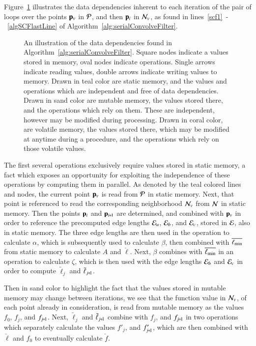 Figure~\ref{fig:sacfDataDependencies} illustrates the data dependencies inherent to each iteration of the pair of loops over the points $\mathbf{p}_v$ in $\mathcal{P}$, and then $\mathbf{p}_i$ in $\mathcal{N}_v$, as found in lines~\ref{scf1}~-~\ref{algSCFlastLine} of Algorithm~\ref{alg:serialConvolveFilter}.

\begin{figure}[ht]
	
	{\caption[Data Dependencies in Serial Algorithm~\ref{alg:serialConvolveFilter}: Calculate Edge Lengths]{An illustration of the data dependencies found in Algorithm~\ref{alg:serialConvolveFilter}. Square nodes indicate a values stored in memory, oval nodes indicate operations. Single arrows indicate reading values, double arrows indicate writing values to memory. Drawn in teal color are static memory, and the values and operations which are independent and free of data dependencies. Drawn in sand color are mutable memory, the values stored there, and the operations which rely on them. These are independent, however may be modified during processing. Drawn in coral color, are volatile memory, the values stored there, which may be modified at anytime during a procedure, and the operations which rely on those volatile values.}\label{fig:sacfDataDependencies}}
\end{figure}

The first several operations exclusively require values stored in static memory, a fact which exposes an opportunity for exploiting the independence of these operations by computing them in parallel. As denoted by the teal colored lines and nodes, the current point $\mathbf{p}_v$ is read from $\mathcal{P}$ in static memory. Next, that point is referenced to read the corresponding neighborhood $\mathcal{N}_v$ from $\mathcal{N}$ in static memory. Then the points $\mathbf{p}_i$ and $\bp_{\sipo}$ are determined, and combined with $\mathbf{p}_v$ in order to reference the precomputed edge lengths $\mathcal{E}_a$, $\mathcal{E}_b$, and $\mathcal{E}_c$, stored in $\mathcal{E}$, also in static memory. The three edge lengths are then used in the operation to calculate $\alpha$, which is subsequently used to calculate $\beta$, then combined with $\overline{\ell_\text{min}}$ from static memory to calculate $A$ and $\check{\ell}$. Next, $\beta$ combines with $\overline{\ell_\text{min}}$ in an operation to calculate $\zeta$, which is then used with the edge lengths $\mathcal{E}_b$ and $\mathcal{E}_c$ in order to compute $\tilde{\ell}_j$ and $\tilde{\ell}_{\sjpo}$.

Then in sand color to highlight the fact that the values stored in mutable memory may change between iterations, we see that the function value in $\mathcal{N}_v$, of each point already in consideration, is read from mutable memory as the values $f_0$, $f_j$, and $f_{\sjpo}$. Next, $\tilde{\ell}_j$ and $\tilde{\ell}_{\sjpo}$ combine with $f_j$, and $f_{\sjpo}$ in two operations which separately calculate the values $f'_j$, and $f'_{\sjpo}$, which are then combined with $\check{\ell}$ and $f_0$ to eventually calculate $\check{f}$.

